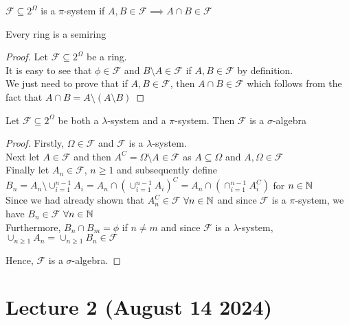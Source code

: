 \begin{definition}[$\pi$-system]
	$\mathcal F \subseteq 2^\Omega$ is a $\pi$-system if $A, B \in \mathcal F \implies A \cap B \in \mathcal F$
\end{definition}

\begin{lemma}
	Every ring is a semiring
\end{lemma}

\begin{proof}
	Let $\mathcal F \subseteq 2^\Omega$ be a ring. \\
	It is easy to see that $\phi \in \mathcal F$ and $B \setminus A \in \mathcal F$ if $A,B \in \mathcal F$ by definition. \\
	We just need to prove that if $A,B \in \mathcal F$, then $A \cap B \in \mathcal F$ which follows from the fact that $A \cap B = A\setminus (A \setminus B)$
\end{proof}

\begin{lemma}
	Let $\mathcal{F} \subseteq 2^\Omega$ be both a $\lambda$-system and a $\pi$-system. Then $\mathcal F$ is a $\sigma$-algebra
\end{lemma}

\begin{proof}
	Firstly, $\Omega \in \mathcal F$ and $\mathcal F$ is a $\lambda$-system. \\
	Next let $A \in \mathcal F$ and then $A^C = \Omega \setminus A \in \mathcal F$ as $A \subseteq \Omega$ and $A, \Omega \in \mathcal F$ \\
	Finally let $A_n \in \mathcal F$, $n \geq 1$ and subsequently define $B_n=A_n \setminus \cup_{i=1}^{n-1} A_i=A_n \cap (\cup_{i=1}^{n-1} A_i)^C= A_n \cap (\cap_{i=1}^{n-1} A_i^C)$ for $n \in \mathbb N$ \\
	Since we had already shown that $A_n^C \in \mathcal F$ $\forall n \in \mathbb N$ and since $\mathcal F$ is a $\pi$-system, we have $B_n \in \mathcal F$ $\forall n \in \mathbb N$ \\
	Furthermore, $B_n \cap B_m = \phi$ if $n \neq m$ and since $\mathcal F$ is a $\lambda$-system, $\cup_{n \geq 1} A_n=\cup_{n \geq 1} B_n \in \mathcal F$
	\vspace{10pt}
	
	Hence, $\mathcal F$ is a $\sigma$-algebra.
\end{proof}

\section{Lecture 2 (August 14 2024)}

